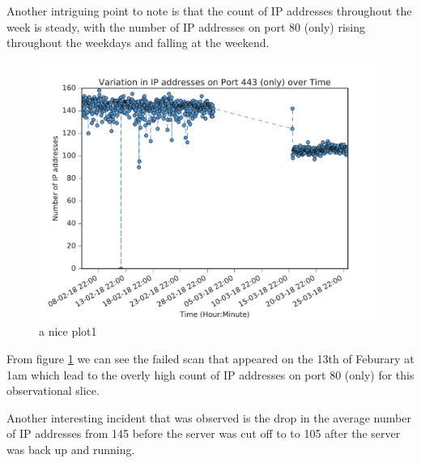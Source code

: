 \documentclass[a4wide,leqno,12pt]{report}
\begin{document}
Another intriguing  point to note is that the count of IP addresses throughout the week is steady, with the number of IP addresses on port 80 (only) rising throughout the weekdays and falling at the weekend.\\

\begin{figure}[h!]
\includegraphics[scale=.5]{pdf_images/VariationInIpAddressesOnPort443OverTime}
\caption{a nice plot1}
\label{fig:port443ZMap}
\end{figure}



From figure \ref{fig:port443ZMap} we can see the failed scan that appeared on the 13th of Feburary at 1am which lead to the overly high count of IP addresses on port 80 (only) for this observational slice.

Another interesting incident that was observed is the drop in the average number of IP addresses from 145 before the server was cut off to to 105 after the server was back up and running.
\end{document}
